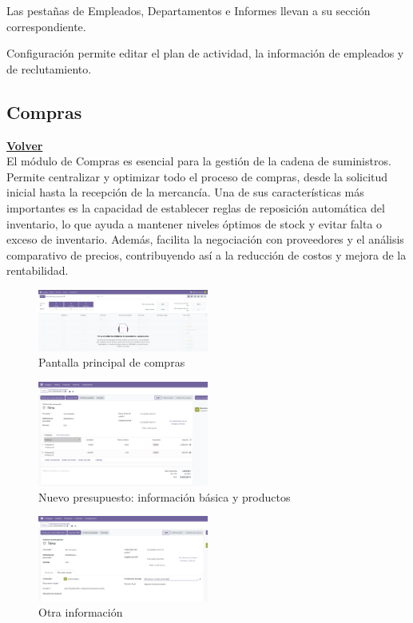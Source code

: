 \documentclass[a4paper,12pt]{article}
\begin{document}
Las pestañas de Empleados, Departamentos e Informes llevan a su sección correspondiente.

Configuración permite editar el plan de actividad, la información de empleados y de reclutamiento.


\subsection{Compras}
\hyperlink{anchor-indice}{\textbf{Volver}}\\

El módulo de Compras es esencial para la gestión de la cadena de suministros. Permite centralizar y optimizar todo el proceso de compras, desde la solicitud inicial hasta la recepción de la mercancía.
Una de sus características más importantes es la capacidad de establecer reglas de reposición automática del inventario, lo que ayuda a mantener niveles óptimos de stock y evitar falta o exceso de inventario. Además, facilita la negociación con proveedores y el análisis comparativo de precios, contribuyendo así a la reducción de costos y mejora de la rentabilidad.

\begin{figure}[h!]
    \centering
    \includegraphics[width=0.5\textwidth]{pr2odoo27-pantallaPrincipalCompras.png}
    \caption{Pantalla principal de compras}
\end{figure}
\FloatBarrier

\begin{figure}[h!]
    \centering
    \includegraphics[width=0.5\textwidth]{pr2odoo28-nuevoPresupuesto.png}
    \caption{Nuevo presupuesto: información básica y productos}
\end{figure}
\FloatBarrier

\begin{figure}[h!]
    \centering
    \includegraphics[width=0.5\textwidth]{pr2odoo29-otraInfo.png}
    \caption{Otra información}
\end{figure}
\FloatBarrier
\end{document}
